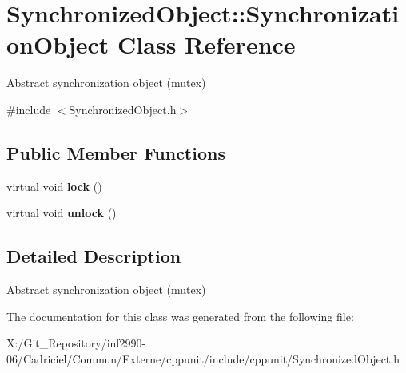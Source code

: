 \hypertarget{class_synchronized_object_1_1_synchronization_object}{\section{Synchronized\-Object\-:\-:Synchronization\-Object Class Reference}
\label{class_synchronized_object_1_1_synchronization_object}
}


Abstract synchronization object (mutex)  




{\ttfamily \#include $<$Synchronized\-Object.\-h$>$}

\subsection*{Public Member Functions}
\begin{DoxyCompactItemize}
\item 
\hypertarget{class_synchronized_object_1_1_synchronization_object_a2c1a4b7e3e3a8f8993140fb1fc9dabe0}{virtual void {\bfseries lock} ()}\label{class_synchronized_object_1_1_synchronization_object_a2c1a4b7e3e3a8f8993140fb1fc9dabe0}

\item 
\hypertarget{class_synchronized_object_1_1_synchronization_object_a2af2a59901a0cdc673dc8729840fe797}{virtual void {\bfseries unlock} ()}\label{class_synchronized_object_1_1_synchronization_object_a2af2a59901a0cdc673dc8729840fe797}

\end{DoxyCompactItemize}


\subsection{Detailed Description}
Abstract synchronization object (mutex) 

The documentation for this class was generated from the following file\-:\begin{DoxyCompactItemize}
\item 
X\-:/\-Git\-\_\-\-Repository/inf2990-\/06/\-Cadriciel/\-Commun/\-Externe/cppunit/include/cppunit/Synchronized\-Object.\-h\end{DoxyCompactItemize}
